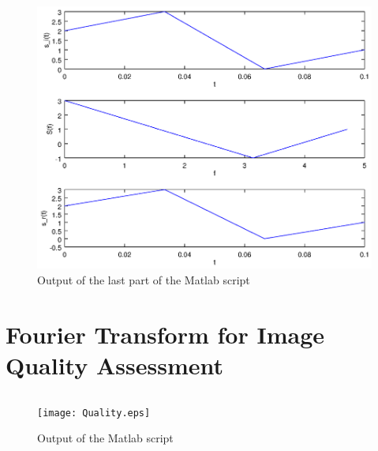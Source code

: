 \documentclass[DIN, pagenumber=false, fontsize=11pt, parskip=half]{scrartcl}
\begin{document}
    \subsection{}
                  
    \begin{figure}[H]
        \centering
        \includegraphics[trim = {0 8cm 27cm 0}, clip,width=\textwidth]{transforms.eps}
        \caption{Output of the last part of the Matlab script}
    \end{figure}

    \section{Fourier Transform for Image Quality Assessment}
    \subsection{}
                  
    \subsection{}
                  
    \subsection{}
                  
    \subsection{}
                  
    \begin{figure}[H]
        \centering
        \texttt{[image: Quality.eps]}
        \caption{Output of the Matlab script}
    \end{figure}
\end{document}
